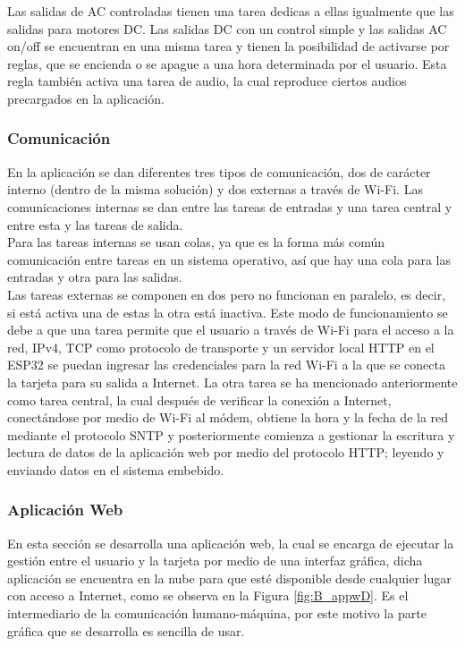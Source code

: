 Las salidas de AC controladas tienen una tarea dedicas a ellas igualmente que las salidas para motores DC. Las salidas DC con un control simple y las salidas AC on/off se encuentran en una misma tarea y tienen la posibilidad de activarse por reglas, que se encienda o se apague a una hora determinada por el usuario. Esta regla también activa una tarea de audio, la cual reproduce ciertos audios precargados en la aplicación.\\

\subsubsection*{Comunicación}

En la aplicación se dan diferentes tres tipos de comunicación, dos de carácter interno (dentro de la misma solución) y dos externas a través de Wi-Fi. Las comunicaciones internas se dan entre las tareas de entradas y una tarea central y entre esta y las tareas de salida.\\

Para las tareas internas se usan colas, ya que es la forma más común comunicación entre tareas en un sistema operativo, así que hay una cola para las entradas y otra para las salidas.\\

Las tareas externas se componen en dos pero no funcionan en paralelo, es decir, si está activa una de estas la otra está inactiva. Este modo de funcionamiento se debe a que una tarea permite que el usuario a través de Wi-Fi para el acceso a la red, IPv4, TCP como protocolo de transporte y un servidor local HTTP en el ESP32 se puedan ingresar las credenciales para la red Wi-Fi a la que se conecta la tarjeta para su salida a Internet. La otra tarea se ha mencionado anteriormente como tarea central, la cual después de verificar la conexión a Internet, conectándose por medio de Wi-Fi al módem, obtiene la hora y la fecha de la red mediante el protocolo SNTP y posteriormente comienza a gestionar la escritura y lectura de datos de la aplicación web por medio del protocolo HTTP; leyendo y enviando datos en el sistema embebido.\\

\subsubsection{Aplicación Web}

En esta sección se desarrolla una aplicación web, la cual se encarga de ejecutar la gestión entre el usuario y la tarjeta por medio de una interfaz gráfica, dicha aplicación se encuentra en la nube para que esté disponible desde cualquier lugar con acceso a Internet, como se observa en la Figura \ref{fig:B_appwD}. Es el intermediario de la comunicación humano-máquina, por este motivo la parte gráfica que se desarrolla es sencilla de usar.\\


